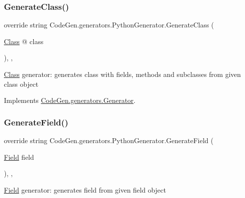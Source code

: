 \subsubsection{\texorpdfstring{Generate\+Class()}{GenerateClass()}}
{\footnotesize\ttfamily override string Code\+Gen.\+generators.\+Python\+Generator.\+Generate\+Class (\begin{DoxyParamCaption}\item[{\mbox{\hyperlink{classCodeGen_1_1generators_1_1Class}{Class}} @}]{class }\end{DoxyParamCaption})\hspace{0.3cm}{\ttfamily [inline]}, {\ttfamily [protected]}, {\ttfamily [virtual]}}



\mbox{\hyperlink{classCodeGen_1_1generators_1_1Class}{Class}} generator\+: generates class with fields, methods and subclasses from given class object  



Implements \mbox{\hyperlink{classCodeGen_1_1generators_1_1Generator_a8847fd8b6d408a0dfc087dcc1dc58340}{Code\+Gen.\+generators.\+Generator}}.

\mbox{\label{classCodeGen_1_1generators_1_1PythonGenerator_aafd171ffd14980515eef644b929bd712}} 
\subsubsection{\texorpdfstring{Generate\+Field()}{GenerateField()}}
{\footnotesize\ttfamily override string Code\+Gen.\+generators.\+Python\+Generator.\+Generate\+Field (\begin{DoxyParamCaption}\item[{\mbox{\hyperlink{classCodeGen_1_1generators_1_1Field}{Field}}}]{field }\end{DoxyParamCaption})\hspace{0.3cm}{\ttfamily [inline]}, {\ttfamily [protected]}, {\ttfamily [virtual]}}



\mbox{\hyperlink{classCodeGen_1_1generators_1_1Field}{Field}} generator\+: generates field from given field object  



